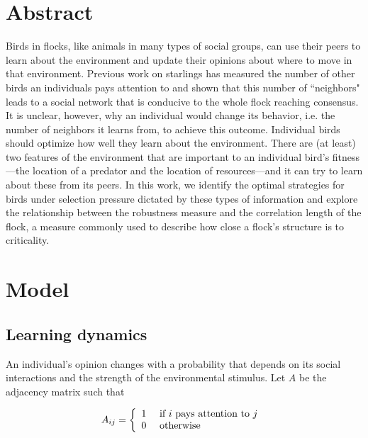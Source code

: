 \documentclass{article}
\begin{document}
%

\tableofcontents

\section{Abstract}
Birds in flocks, like animals in many types of social groups, can use their peers to learn about the environment and update their opinions about where to move in that environment.  Previous work on starlings has measured the number of other birds an individuals pays attention to and shown that this number of ``neighbors" leads to a social network that is conducive to the whole flock reaching consensus.  It is unclear, however, why an individual would change its behavior, i.e. the number of neighbors it learns from, to achieve this outcome.  Individual birds should optimize how well they learn about the environment. There are (at least) two features of the environment that are important to an individual bird's fitness---the location of a predator and the location of resources---and it can try to learn about these from its peers. In this work, we identify the optimal strategies for birds under selection pressure dictated by these types of information and explore the relationship between the robustness measure and the correlation length of the flock, a measure commonly used to describe how close a flock's structure is to criticality.


\section{Model }
\subsection{Learning dynamics }
An individual's opinion changes with a probability that depends on its social interactions and the strength of the environmental stimulus. Let $A$ be the adjacency matrix such that 

\begin{equation}
A_{ij}=\left\{\begin{array}{l l l}
1 & \text{ if $i$ pays attention to $j$ }
\\0 & \text{ otherwise }
\end{array}\right.
\end{equation}
\end{document}
